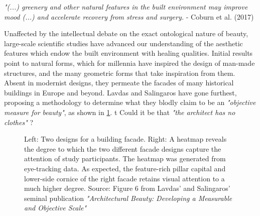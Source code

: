 \documentclass{article}
\begin{document}
\begin{multicols}{2}
\textit{"(...) greenery and other natural features in the built environment may improve mood (...) and accelerate recovery from stress and surgery.} \newline - Coburn et al. (2017) \cite{coburn_buildings_2017}

Unaffected by the intellectual debate on the exact ontological nature of beauty, large-scale scientific studies have advanced our understanding of the aesthetic features which endow the built environment with healing qualities. Initial results point to natural forms, which for millennia have inspired the design of man-made structures, and the many geometric forms that take inspiration from them. Absent in modernist designs, they permeate the facades of many historical buildings in Europe and beyond. Lavdas and Salingaros have gone furthest, proposing a methodology to determine what they blodly claim to be an \textit{"objective measure for beauty"}, as shown in \cref{fig:heatmap}. t Could it be that \textit{"the architect has no clothes"} \cite{mehaffy_architect_2011}?

\end{multicols}

\begin{figure}[H]
    \centering
     \hspace{2.5mm}
    \caption{Left: Two designs for a building facade. Right: A heatmap reveals the degree to which the two different facade designs capture the attention of study participants. The heatmap was generated from eye-tracking data. As expected, the feature-rich pillar capital and lower-side cornice of the right facade retains visual attention to a much higher degree. Source: Figure 6 from Lavdas' and Salingaros' seminal publication \textit{"Architectural Beauty: Developing a Measurable and Objective Scale"} \cite{lavdas_architectural_2022}}
    \label{fig:heatmap}
\end{figure}
\end{document}
